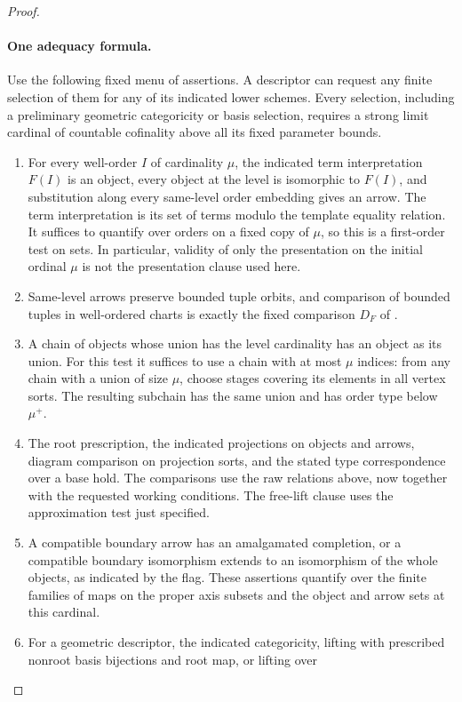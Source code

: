 \begin{proof}
\paragraph{One adequacy formula.}
Use the following fixed menu of assertions.  A descriptor can request
any finite selection of them for any of its indicated lower schemes.
Every selection, including a preliminary geometric categoricity or
basis selection, requires a strong limit cardinal of countable
cofinality above all its fixed parameter bounds.
\begin{enumerate}
\item For every well-order
$I$ of cardinality $\mu$, the indicated term interpretation $F(I)$ is
an object, every object at the level is isomorphic to $F(I)$, and
substitution along every same-level order embedding gives an arrow.
The term interpretation is its set of terms modulo the template
equality relation.  It suffices to quantify over orders on a fixed
copy of $\mu$, so this is a first-order test on sets.  In particular,
validity of only the presentation on the initial ordinal $\mu$ is
not the presentation clause used here.
\item Same-level arrows preserve bounded tuple orbits, and comparison of
bounded tuples in well-ordered charts is exactly the fixed comparison
$D_F$ of .
\item A chain of objects whose union has the level cardinality has an
object as its union.  For this test it suffices to use a chain with at
most $\mu$ indices: from any chain with a union of size $\mu$, choose
stages covering its elements in all vertex sorts.  The resulting
subchain has the same union and has order type below $\mu^+$.
\item The root prescription, the indicated projections on objects and
arrows, diagram comparison on projection sorts, and the stated type
correspondence over a base hold.  The comparisons use the raw relations
above, now together with the requested working conditions.  The
free-lift clause uses the approximation test just specified.
\item A compatible boundary arrow has an amalgamated completion, or a
compatible boundary isomorphism extends to an isomorphism of the whole
objects, as indicated by the flag.  These assertions quantify over the
finite families of maps on the proper axis subsets and the object and
arrow sets at this cardinal.
\item For a geometric descriptor, the indicated categoricity, lifting
with prescribed nonroot basis bijections and root map, or lifting over

\end{enumerate}
\end{proof}
